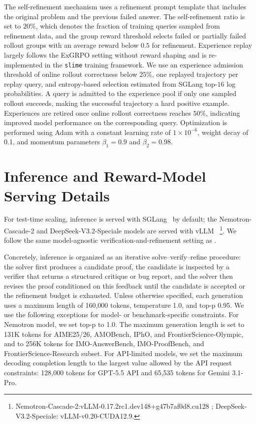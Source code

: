 The self-refinement mechanism uses a refinement prompt template that includes the original problem and the previous failed answer. The self-refinement ratio is set to $20\%$, which denotes the fraction of training queries sampled from refinement data, and the group reward threshold selects failed or partially failed rollout groups with an average reward below $0.5$ for refinement. Experience replay largely follows the ExGRPO setting without reward shaping and is re-implemented in the \texttt{slime} training framework. We use an experience admission threshold of online rollout correctness below $25\%$, one replayed trajectory per replay query, and entropy-based selection estimated from SGLang top-$16$ log probabilities. A query is admitted to the experience pool if only one sampled rollout succeeds, making the successful trajectory a hard positive example. Experiences are retired once online rollout correctness reaches $50\%$, indicating improved model performance on the corresponding query. Optimization is performed using Adam with a constant learning rate of $1\times 10^{-6}$, weight decay of 0.1, and momentum parameters $\beta_1=0.9$ and $\beta_2=0.98$.

\section{Inference and Reward-Model Serving Details}
\label{app:inference-serving-details}


For test-time scaling, inference is served with SGLang~\citep{sglang2026repo} by default; the Nemotron-Cascade-2 and DeepSeek-V3.2-Speciale models are served with vLLM~\citep{vllm2026repo} \footnote{Nemotron-Cascade-2:vLLM-0.17.2rc1.dev148+g47b7af0d8.cu128 ; DeepSeek-V3.2-Speciale: vLLM-v0.20-CUDA12.9.}. We follow the same model-agnostic verification-and-refinement setting as \citet{huang2025winning}. 

Concretely, inference is organized as an iterative solve--verify--refine procedure: the solver first produces a candidate proof, the candidate is inspected by a verifier that returns a structured critique or bug report, and the solver then revises the proof conditioned on this feedback until the candidate is accepted or the refinement budget is exhausted. 
Unless otherwise specified, each generation uses a maximum length of 160,000 tokens, temperature 1.0, and top-p 0.95. We use the following exceptions for model- or benchmark-specific constraints. For Nemotron model, we set top-p to 1.0. The maximum generation length is set to 131K tokens for AIME25/26, AMOBench, IPhO, and FrontierScience-Olympic, and to 256K tokens for IMO-AnswerBench, IMO-ProofBench, and FrontierScience-Research subset. 
For API-limited models, we set the maximum decoding completion length to the largest value allowed by the API request constraints: 128,000 tokens for GPT-5.5 API and 65,535 tokens for Gemini 3.1-Pro.


